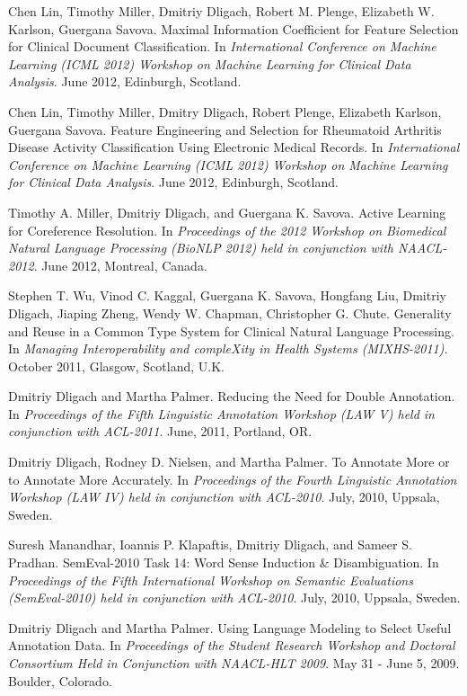 \documentclass[letterpaper]{article}
\renewenvironment{itemize}{
  \begin{list}{}{
    \setlength{\leftmargin}{1.5em}
  }
}{
  \end{list}
}
\begin{document}
\begin{itemize}
\item Chen Lin, Timothy Miller, Dmitriy Dligach, Robert M. Plenge, Elizabeth W. Karlson, Guergana Savova. Maximal Information Coefficient for Feature Selection for Clinical Document Classification. In \emph{International Conference on Machine Learning (ICML 2012) Workshop on Machine Learning for Clinical Data Analysis}. June 2012, Edinburgh, Scotland.
\item Chen Lin, Timothy Miller, Dmitry Dligach, Robert Plenge, Elizabeth Karlson, Guergana Savova. Feature Engineering and Selection for Rheumatoid Arthritis Disease Activity Classification Using Electronic Medical Records. In \emph{International Conference on Machine Learning (ICML 2012) Workshop on Machine Learning for Clinical Data Analysis}. June 2012, Edinburgh, Scotland.
\item Timothy A. Miller, Dmitriy Dligach, and Guergana K. Savova. Active Learning for Coreference Resolution. In \emph{Proceedings of the 2012 Workshop on Biomedical Natural Language Processing (BioNLP 2012) held in conjunction with NAACL-2012}. June 2012, Montreal, Canada.
\item Stephen T. Wu, Vinod C. Kaggal, Guergana K. Savova, Hongfang Liu, Dmitriy Dligach, Jiaping Zheng, Wendy W. Chapman, Christopher G. Chute. Generality and Reuse in a Common Type System for Clinical Natural Language Processing. In \emph{Managing Interoperability and compleXity in Health Systems (MIXHS-2011)}. October 2011, Glasgow, Scotland, U.K.
\item Dmitriy Dligach and Martha Palmer. Reducing the Need for Double Annotation. In \emph{Proceedings of the Fifth Linguistic Annotation Workshop (LAW V) held in conjunction with ACL-2011}. June, 2011, Portland, OR.
\item Dmitriy Dligach, Rodney D. Nielsen, and Martha Palmer. To Annotate More or to Annotate More Accurately. In \emph{Proceedings of the Fourth Linguistic Annotation Workshop (LAW IV) held in conjunction with ACL-2010}. July, 2010, Uppsala, Sweden.
\item Suresh Manandhar, Ioannis P. Klapaftis, Dmitriy Dligach, and Sameer S. Pradhan. SemEval-2010 Task 14: Word Sense Induction \& Disambiguation. In \emph{Proceedings of the Fifth International Workshop on Semantic Evaluations (SemEval-2010) held in conjunction with ACL-2010}. July, 2010, Uppsala, Sweden.
\item Dmitriy Dligach and Martha Palmer. Using Language Modeling to Select Useful Annotation Data. In \emph {Proceedings of the Student Research Workshop and Doctoral Consortium Held in Conjunction with NAACL-HLT 2009}. May 31 - June 5, 2009. Boulder, Colorado.

\end{itemize}
\end{document}
